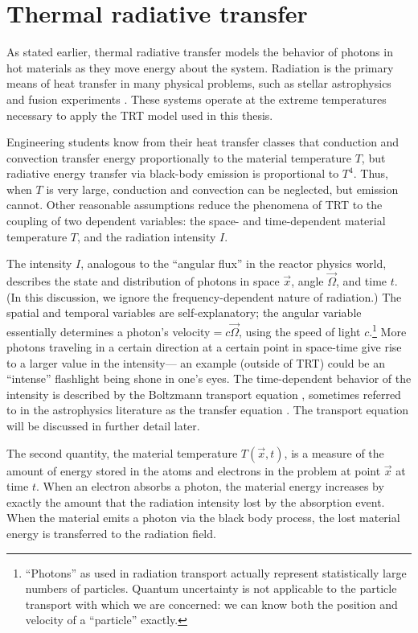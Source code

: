 \section{Thermal radiative transfer}

As stated earlier, thermal radiative transfer models the behavior of
photons in hot materials as they move energy about the system. Radiation is the
primary means of heat transfer in many physical problems, such as stellar
astrophysics and fusion experiments \cite{Pom1973,Mih1984}. These systems
operate at the extreme
temperatures necessary to apply the TRT model used in this thesis.

Engineering students know from their heat transfer classes that conduction and
convection transfer energy proportionally to the material
temperature $T$, but radiative energy transfer via black-body emission is
proportional to $T^4$. Thus, when $T$ is very large, conduction and convection
can be neglected, but emission cannot. Other reasonable assumptions
reduce the phenomena of
TRT to the coupling of two dependent variables: the space- and time-dependent material
temperature $T$, and the radiation intensity $I$.

The intensity $I$, analogous to the ``angular flux'' in the reactor physics
world,
describes the state and distribution of photons in space $\vec{x}$, angle
$\vec{\Omega}$, and time $t$.
(In this discussion, we ignore the frequency-dependent nature of radiation.)
The spatial and temporal variables are self-explanatory; the angular
variable essentially determines a photon's velocity${}=c\vec{\Omega}$, using
the speed of light $c$.\footnote{%
``Photons'' as used in radiation transport actually represent statistically
large numbers of particles. Quantum uncertainty is not applicable to the
particle transport with which we are concerned: we can know both the position
and velocity of a ``particle'' exactly.}  
More photons traveling in a certain direction at a certain
point in space-time give rise to a larger value in the intensity---%
an example (outside of TRT) could be an ``intense'' flashlight being shone in
one's eyes.  The time-dependent behavior of the intensity is described by the
Boltzmann transport equation \cite{Dud1976}, sometimes referred to in the
astrophysics literature as the transfer equation \cite{Mih1984}.
The transport equation will be discussed in further detail later.

The second quantity, the material temperature $T(\vec{x},t)$, is a measure of
the amount
of energy stored in the atoms and electrons in the problem at point
$\vec{x}$ at time $t$. When an electron
absorbs a photon, the material energy increases by exactly the amount that the
radiation intensity lost by the absorption event. When the material emits a
photon via the black body process, the lost material energy is transferred to
the radiation field.

